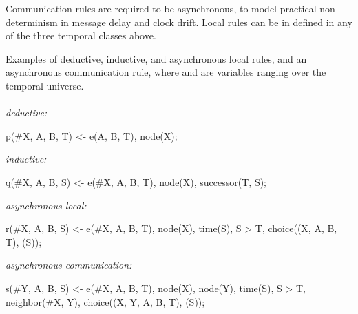 Communication rules are required to be asynchronous, to model practical non-determinism in message delay and clock drift.  Local rules can be in defined in any of the three temporal classes above.

\begin{example}
\label{ex:nonsugared}
Examples of deductive, inductive, and asynchronous local rules, and an asynchronous communication rule, where  and  are variables ranging over the temporal universe.
\\\\
\textit{deductive:}\\
\begin{Dedalus}
p(#X, A, B, T) <- e(A, B, T), node(X);
\end{Dedalus}
\textit{inductive:}\\
\begin{Dedalus}
q(#X, A, B, S) <- e(#X, A, B, T), node(X),
                  successor(T, S);
\end{Dedalus}
\textit{asynchronous local:}\\
\begin{Dedalus}
r(#X, A, B, S) <- e(#X, A, B, T), node(X), time(S),
                  S > T, choice((X, A, B, T), (S));
\end{Dedalus}
\textit{asynchronous communication:}\\
\begin{Dedalus}
s(#Y, A, B, S) <- e(#X, A, B, T), node(X), node(Y),
                  time(S), S > T, neighbor(#X, Y),
                  choice((X, Y, A, B, T), (S));
\end{Dedalus}
\end{example}

